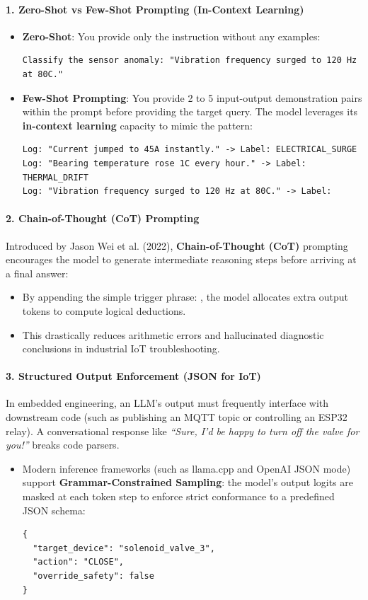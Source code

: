 \paragraph{1. Zero-Shot vs Few-Shot Prompting (In-Context Learning)}
\begin{itemize}
    \item \textbf{Zero-Shot}: You provide only the instruction without any examples:
    \begin{lstlisting}[style=outputstyle]
Classify the sensor anomaly: "Vibration frequency surged to 120 Hz at 80C."
    \end{lstlisting}
    \item \textbf{Few-Shot Prompting}: You provide 2 to 5 input-output demonstration pairs within the prompt before providing the target query. The model leverages its \textbf{in-context learning} capacity to mimic the pattern:
    \begin{lstlisting}[style=outputstyle]
Log: "Current jumped to 45A instantly." -> Label: ELECTRICAL_SURGE
Log: "Bearing temperature rose 1C every hour." -> Label: THERMAL_DRIFT
Log: "Vibration frequency surged to 120 Hz at 80C." -> Label:
    \end{lstlisting}
\end{itemize}

\paragraph{2. Chain-of-Thought (CoT) Prompting}
Introduced by Jason Wei et al. (2022), \textbf{Chain-of-Thought (CoT)} prompting encourages the model to generate intermediate reasoning steps before arriving at a final answer:
\begin{itemize}
    \item By appending the simple trigger phrase: , the model allocates extra output tokens to compute logical deductions.
    \item This drastically reduces arithmetic errors and hallucinated diagnostic conclusions in industrial IoT troubleshooting.
\end{itemize}

\paragraph{3. Structured Output Enforcement (JSON for IoT)}
In embedded engineering, an LLM's output must frequently interface with downstream code (such as publishing an MQTT topic or controlling an ESP32 relay). A conversational response like \emph{``Sure, I'd be happy to turn off the valve for you!''} breaks code parsers.
\begin{itemize}
    \item Modern inference frameworks (such as llama.cpp and OpenAI JSON mode) support \textbf{Grammar-Constrained Sampling}: the model's output logits are masked at each token step to enforce strict conformance to a predefined JSON schema:
    \begin{lstlisting}[style=outputstyle]
{
  "target_device": "solenoid_valve_3",
  "action": "CLOSE",
  "override_safety": false
}
    \end{lstlisting}
\end{itemize}

